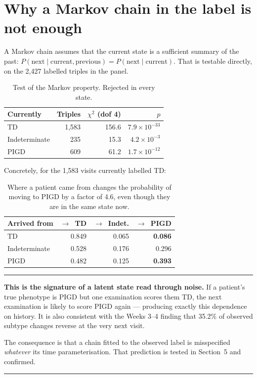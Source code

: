 \documentclass[11pt,a4paper]{article}
\newcommand{\arr}{$\rightarrow$}
\newenvironment{keypoint}
  {\begin{center}\begin{minipage}{0.94\textwidth}%
   \vspace{4pt}\hrule\vspace{7pt}\small}
  {\vspace{7pt}\hrule\vspace{4pt}\end{minipage}\end{center}}
\begin{document}
\section{Why a Markov chain in the label is not enough}

A Markov chain assumes that the current state is a sufficient summary of the
past: $P(\text{next} \mid \text{current}, \text{previous}) =
P(\text{next} \mid \text{current})$. That is testable directly, on the 2{,}427
labelled triples in the panel.

\begin{table}[htbp]
\centering
\begin{tabular}{@{}lrrr@{}}
\toprule
\textbf{Currently} & \textbf{Triples} & \textbf{$\chi^2$ (dof 4)} & \textbf{$p$} \\
\midrule
TD            & 1{,}583 & 156.6 & $7.9\times10^{-33}$ \\
Indeterminate &    235 &  15.3 & $4.2\times10^{-3}$ \\
PIGD          &    609 &  61.2 & $1.7\times10^{-12}$ \\
\bottomrule
\end{tabular}
\caption{Test of the Markov property. Rejected in every state.}
\end{table}

\noindent
Concretely, for the 1{,}583 visits currently labelled TD:

\begin{table}[htbp]
\centering
\begin{tabular}{@{}lrrr@{}}
\toprule
\textbf{Arrived from} & \textbf{\arr\ TD} & \textbf{\arr\ Indet.} & \textbf{\arr\ PIGD} \\
\midrule
TD            & 0.849 & 0.065 & \textbf{0.086} \\
Indeterminate & 0.528 & 0.176 & 0.296 \\
PIGD          & 0.482 & 0.125 & \textbf{0.393} \\
\bottomrule
\end{tabular}
\caption{Where a patient came from changes the probability of moving to PIGD by
a factor of 4.6, even though they are in the same state now.}
\end{table}

\begin{keypoint}
\textbf{This is the signature of a latent state read through noise.} If a
patient's true phenotype is PIGD but one examination scores them TD, the next
examination is likely to score PIGD again --- producing exactly this dependence
on history. It is also consistent with the Weeks 3--4 finding that 35.2\% of
observed subtype changes reverse at the very next visit.

The consequence is that a chain fitted to the observed label is misspecified
\emph{whatever} its time parameterisation. That prediction is tested in
Section~5 and confirmed.
\end{keypoint}
\end{document}
